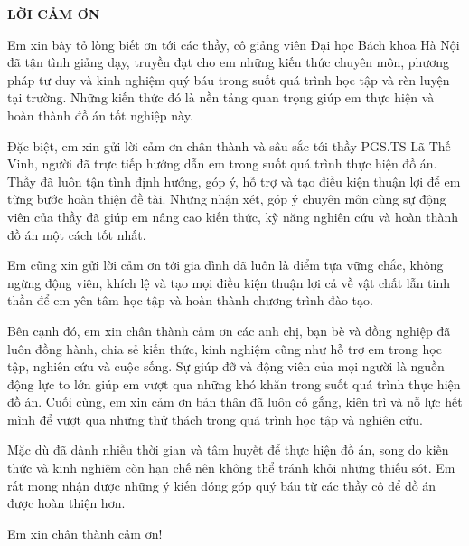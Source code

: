 \documentclass[../DoAn.tex]{subfiles}
\begin{document}
\begin{center}
    \Large{\textbf{LỜI CẢM ƠN}}\\
\end{center}
\vspace{1cm}

Em xin bày tỏ lòng biết ơn tới các thầy, cô giảng viên Đại học Bách khoa Hà Nội đã tận tình giảng dạy, truyền đạt cho em những kiến thức chuyên môn, phương pháp tư duy và kinh nghiệm quý báu trong suốt quá trình học tập và rèn luyện tại trường. Những kiến thức đó là nền tảng quan trọng giúp em thực hiện và hoàn thành đồ án tốt nghiệp này.

Đặc biệt, em xin gửi lời cảm ơn chân thành và sâu sắc tới thầy PGS.TS Lã Thế Vinh, người đã trực tiếp hướng dẫn em trong suốt quá trình thực hiện đồ án. Thầy đã luôn tận tình định hướng, góp ý, hỗ trợ và tạo điều kiện thuận lợi để em từng bước hoàn thiện đề tài. Những nhận xét, góp ý chuyên môn cùng sự động viên của thầy đã giúp em nâng cao kiến thức, kỹ năng nghiên cứu và hoàn thành đồ án một cách tốt nhất.

Em cũng xin gửi lời cảm ơn tới gia đình đã luôn là điểm tựa vững chắc, không ngừng động viên, khích lệ và tạo mọi điều kiện thuận lợi cả về vật chất lẫn tinh thần để em yên tâm học tập và hoàn thành chương trình đào tạo.

Bên cạnh đó, em xin chân thành cảm ơn các anh chị, bạn bè và đồng nghiệp đã luôn đồng hành, chia sẻ kiến thức, kinh nghiệm cũng như hỗ trợ em trong học tập, nghiên cứu và cuộc sống. Sự giúp đỡ và động viên của mọi người là nguồn động lực to lớn giúp em vượt qua những khó khăn trong suốt quá trình thực hiện đồ án. Cuối cùng, em xin cảm ơn bản thân đã luôn cố gắng, kiên trì và nỗ lực hết mình để vượt qua những thử thách trong quá trình học tập và nghiên cứu.

Mặc dù đã dành nhiều thời gian và tâm huyết để thực hiện đồ án, song do kiến thức và kinh nghiệm còn hạn chế nên không thể tránh khỏi những thiếu sót. Em rất mong nhận được những ý kiến đóng góp quý báu từ các thầy cô để đồ án được hoàn thiện hơn.

Em xin chân thành cảm ơn!
\end{document}
